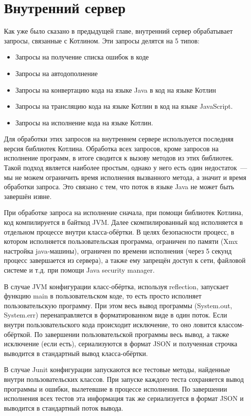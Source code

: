 \section{Внутренний сервер}
	Как уже было сказано в предыдущей главе, внутренний
сервер обрабатывает запросы, связанные с Котлином. Эти запросы делятся на 5 типов:
\begin{itemize}
	\item Запросы на получение списка ошибок в коде
	\item Запросы на автодополнение
	\item Запросы на конвертацию кода на языке Java в код на языке Котлин
	\item Запросы на трансляцию кода на языке  Котлин в код на языке JavaScript.
	\item Запросы на исполнение кода на языке Котлин.
\end{itemize}
	Для обработки этих запросов на внутреннем сервере используется последняя версия библиотек Котлина. Обработка всех запросов, кроме запросов на исполнение программ, в итоге сводится к вызову методов из этих библиотек. Такой подход является наиболее простым, однако у него есть один недостаток~--- мы не можем ограничить время исполнения вызванного метода, а значит и время обработки запроса. Это связано с тем, что поток в языке Java не может быть завершён извне. 
	
	При обработке запроса на исполнение сначала, при помощи библиотек Котлина, код компилируется в байткод JVM. Далее скомпилированный код исполняется в отдельном процессе внутри класса-обёртки. В целях безопасности	процесс, в котором исполняется пользовательская программа, ограничен по памяти (Xmx настройка java-машины), ограничен по времени исполнения (через 5 секунд процесс завершается из сервера), а также ему запрещён доступ к сети, файловой системе и т.д. при помощи Java security manager. 
	
	В случае JVM конфигурации класс-обёртка, используя reflection, запускает функцию main в пользовательском коде, то есть просто исполняет пользовательскую программу. При этом весь вывод программы (System.out,  Sys\-tem.err) перенаправляется в форматированном виде в один поток. Если внутри пользовательского кода происходит исключение, то оно ловится классом-обёрткой. По завершении пользовательской программы весь вывод, а также исключение (если есть), сериализуются в формат JSON и полученная строчка выводится в стандартный вывод класса-обёртки.
	
	В случае Junit конфигурации запускаются все тестовые методы, найденные внутри пользовательских классов. При запуске каждого теста сохраняется вывод программы и ошибки, вылетевшие в процессе исполнения. По завершении исполнения всех тестов эта информация так же сериализуется в формат JSON и выводится в стандартный поток вывода.
	

	
	
	
